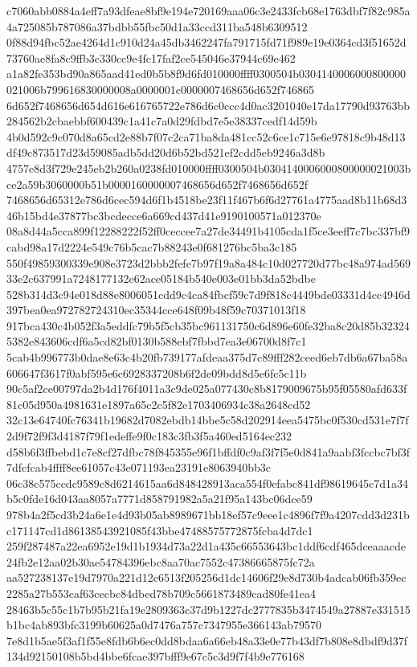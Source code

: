 c7060abb0884a4eff7a93dfeae8bf9e194e720169aaa06c3e2433fcb68e1763dbf7f82c985a4a725085b787086a37bdbb55fbc50d1a33ccd311ba548b6309512
0f88d94fbc52ae4264d1c910d24a45db3462247fa791715fd71f989e19e0364cd3f51652d73760ae8fa8c9ffb3c330cc9e4fc17faf2ce545046e37944c69e462
a1a82fe353bd90a865aad41ed0b5b8f9d6fd010000ffff0300504b0304140006000800000021006b799616830000008a0000001c0000007468656d652f746865
6d652f7468656d654d616e616765722e786d6c0ccc4d0ac3201040e17da17790d93763bb284562b2cbaebbf600439c1a41c7a0d29fdbd7e5e38337cedf14d59b
4b0d592c9c070d8a65cd2e88b7f07c2ca71ba8da481cc52c6ce1c715e6e97818c9b48d13df49c873517d23d59085adb5dd20d6b52bd521ef2cdd5eb9246a3d8b
4757e8d3f729e245eb2b260a0238fd010000ffff0300504b0304140006000800000021003bce2a59b3060000b51b0000160000007468656d652f7468656d652f
7468656d65312e786d6cec594d6f1b4518be23f11f467b6f6d27761a4775aad8b11b68d346b15bd4e37877bc3bcdecce6a669cd437d41e9190100571a012370e
08a8d44a5cca899f12288222f52ff0ceccee7a27de34491b4105cda1f5ce3eeff7c7bc337bf9cabd98a17d2224e549c76b5cac7b88243e0f681276bc5ba3c185
550f49859300339e908e3723d2bbb2fefe7b97f19a8a484c10d027720d77bc48a974ad56933e2c637991a7248177132e62ace05184b540e003e01bb3da52bdbe
528b314d3c94e018d88e8006051cdd9c4ca84fbcf59c7d9f818c4449bde03331d4cc4946d397bea0ea972782724310ec35344cce648f09b48f59c70371013f18
917bca430c4b052f3a5eddfc79b5f5cb35bc961131750c6d896e60fe32ba8c20d85b323245382e843606cdf6a5cd82bf0130b588ebf7fbbd7ea3e06700d8f7c1
5cab4b996773b0dae8e63c4b20fb739177afdeaa375d7c89fff282ceed6eb7db6a67ba58a606647f3617f0abf595e6c6928337208b6f2de09bdd8d5e6fc5c11b
90c5af2ce00797da2b4d176f4011a3c9de025a077430c8b8179009675b95f05580afd633f81c05d950a4981631e1897a65c2c5f82e1703406934c38a2648cd52
32c13e64740fc76341b19682d7082ebdb14bbe5c58d202914eea5475bc0f530cd531e7f7f2d9f72f9f3d4187f79f1edeffe9f0c183c3fb3f5a460ed5164ec232
d58b6f3ffbebd1c7e8cf27dfbc78f845355e96f1bffdf0c9af3f7f5e0d841a9aabf3fccbc7bf3f7dfcfcab4ffff8ee61057c43e071193ea23191e8063940bb3c
06c38c575ccdc9589c8d6214615aa6d848428913aca554f0efabc841df98619645c7d1a34b5c0fde16d043aa8057a7771d858791982a5a21f95a143bc06dce59
978b4a2f5cd3b24a6e1e4d93b05ab8989671bb18ef57c9eee1c4896f7f9a4207cdd3d231bc171147cd1d86138543921085f43bbe47488575772875fcba4d7dc1
259f287487a22ea6952e19d1b1934d73a22d1a435c66553643bc1ddf6cdf465dceaaacde24fb2e12aa02b30ae54784396ebc8aa70ac7552c47386665875fc72a
aa527238137e19d7970a221d12c6513f205256d1dc14606f29e8d730b4adcab06fb359ec2285a27b553caf63cecbc84dbed78b709c5661873489cad80fe41ea4
28463b5c55c1b7b95b21fa19e2809363c37d9b1227dc2777835b3474549a27887e331515b1bc4ab893bfc3199b60625a0d7476a757c7347955e366143ab79570
7e8d1b5ae5f3af1f55e8fdb6b6ec0dd8bdaa6a66eb48a33e0e77b43df7b808e8dbdf9d37f134d92150108b5bd4bbe6fcae397bfff9e67c5c3d9f7f4b9e776168
